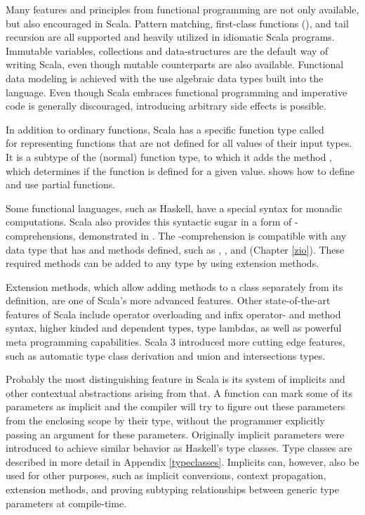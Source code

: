 Many features and principles from functional programming are not only available, but also encouraged in Scala. Pattern matching, first-class functions (), and tail recursion are all supported and heavily utilized in idiomatic Scala programs. Immutable variables, collections and data-structures are the default way of writing Scala, even though mutable counterparts are also available. Functional data modeling is achieved with the use algebraic data types built into the language. Even though Scala embraces functional programming and imperative code is generally discouraged, introducing arbitrary side effects is possible.



In addition to ordinary functions, Scala has a specific function type called \\ for representing functions that are not defined for all values of their input types. It is a subtype of the (normal) function type, to which it adds the method , which determines if the function is defined for a given value.  shows how to define and use partial functions.



Some functional languages, such as Haskell, have a special syntax for monadic computations. Scala also provides this syntactic sugar in a form of -comprehen\-sions, demonstrated in .
The -comprehension is compatible with any data type that has  and  methods defined, such as , , and  (Chapter \ref{zio}). These required methods can be added to any type by using extension methods.

Extension methods, which allow adding methods to a class separately from its definition, are one of Scala's more advanced features. Other state-of-the-art features of Scala include operator overloading and infix operator- and method syntax, higher kinded and dependent types, type lambdas, as well as powerful meta programming capabilities. Scala 3 introduced more cutting edge features, such as automatic type class derivation and union and intersections types.

Probably the most distinguishing feature in Scala is its system of implicits and other contextual abstractions arising from that. A function can mark some of its parameters as implicit and the compiler will try to figure out these parameters from the enclosing scope by their type, without the programmer explicitly passing an argument for these parameters. Originally implicit parameters were introduced to achieve similar behavior as Haskell's type classes. Type classes are described in more detail in Appendix \ref{typeclasses}. Implicits can, however, also be used for other purposes, such as implicit conversions, context propagation, extension methods, and proving subtyping relationships between generic type parameters at compile-time.~\cite{tc-as-objects}

